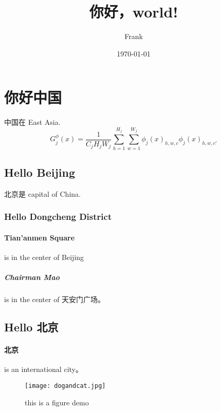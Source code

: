 \documentclass[UTF8]{ctexart}
\title{你好，world!}
\author{Frank}
\date{\today}
\begin{document}
	\maketitle
	\section{你好中国}
	中国在 East Asia.
	\begin{equation}
		G_{j}^{\phi}(x)=\frac{1}{C_{j}H_{j}W_{j}}\sum_{h=1}^{H_{j}}\sum_{w=1}^{W_{j}}\phi_{j}(x)_{h,w,c}\phi _{j}(x)_{h,w,c'}
	\end{equation}
	\subsection{Hello Beijing}
	北京是 capital of China.
	\subsubsection{Hello Dongcheng District}
	\paragraph{Tian'anmen Square}
	is in the center of Beijing
	\subparagraph{Chairman Mao}
	is in the center of 天安门广场。
	\subsection{Hello 北京}
	\paragraph{北京} is an international city。
	\begin{figure}[!t]               
		\centering
		\texttt{[image: dogandcat.jpg]}
		\caption{this is a figure demo}
		\label{fig_sim}
	\end{figure}
\end{document}
